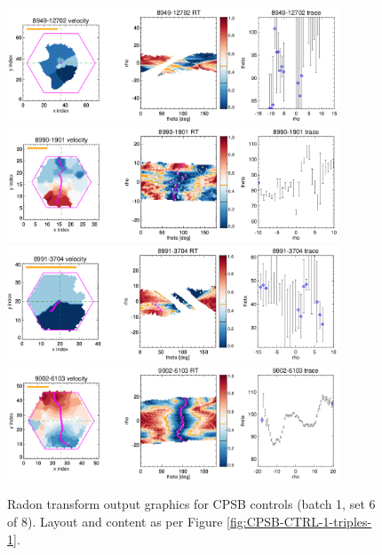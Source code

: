 \documentclass[fleqn,usenatbib]{mnras}
\begin{document}
\begin{figure}
    \centering
    \includegraphics[width=0.88\textwidth]{Images/SN1-MC250/CPSB-CTRL-1-triples/8949-12704-1-250-10.png}
    \includegraphics[width=0.88\textwidth]{Images/SN1-MC250/CPSB-CTRL-1-triples/8990-1901-1-250-10.png}
    \includegraphics[width=0.88\textwidth]{Images/SN1-MC250/CPSB-CTRL-1-triples/8991-3704-1-250-10.png}
    \includegraphics[width=0.88\textwidth]{Images/SN1-MC250/CPSB-CTRL-1-triples/9002-6103-1-250-10.png}    
    \caption{Radon transform output graphics for CPSB controls (batch 1, set 6 of 8). Layout and content as per Figure \ref{fig:CPSB-CTRL-1-triples-1}.}
    \label{fig:CPSB-CTRL-1-triples-6}
\end{figure}
\end{document}
